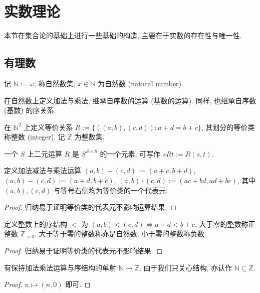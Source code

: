 \section{实数理论}

本节在集合论的基础上进行一些基础的构造, 主要在于实数的存在性与唯一性.

\subsection{有理数}

\begin{definition}
    记 \(\mathbb{N} := \omega\), 称自然数集, \(x \in \mathbb{N}\) 为自然数 (natural number).
\end{definition}

在自然数上定义加法与乘法, 继承自序数的运算 (基数的运算).
同样, 也继承自序数 (基数) 的序关系.

\begin{definition}
    在 \(\mathbb{N}^2\) 上定义等价关系 \(R := \{((a,b),(c,d)) : a + d = b + c\}\),
    其划分的等价类称整数 (integer). 记 \(\mathbb{Z}\) 为整数集.
\end{definition}

\begin{definition}
    一个 \(S\) 上二元运算 \(R\) 是 \(S^{S \times S}\) 的一个元素, 可写作 \(s R t := R(s,t)\).
\end{definition}

\begin{definition}
    定义加法减法与乘法运算 \((a,b) + (c,d) := (a + c, b + d)\), \((a,b) - (c,d) := (a + d, b + c)\),
    \((a,b) \cdot (c,d) := (ac + bd, ad + bc)\), 其中 \((a,b),(c,d)\) 与等号右侧均为等价类的一个代表元.

    \begin{proof}
        归纳易于证明等价类的代表元不影响运算结果.
    \end{proof}
\end{definition}

\begin{definition}
    定义整数上的序结构 \(<\) 为 \((a,b) < (c,d) \iff a + d < b + c\), 大于零的整数称正整数 \(\mathbb{Z}_{> 0}\), 大于等于零的整数称亦是自然数, 小于零的整数称负数.

    \begin{proof}
        归纳易于证明等价类的代表元不影响结果.
    \end{proof}
\end{definition}

\begin{lemma}
    有保持加法乘法运算与序结构的单射 \(\mathbb{N} \to \mathbb{Z}\), 由于我们只关心结构, 亦认作 \(\mathbb{N} \subseteq \mathbb{Z}\).

    \begin{proof}
        \(n \mapsto (n,0)\) 即可.
    \end{proof}
\end{lemma}

